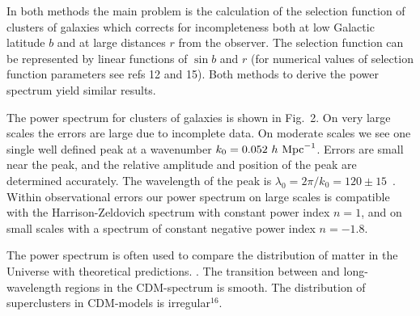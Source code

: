 In both methods the main problem is the calculation of the selection
function of clusters of galaxies which corrects for incompleteness
both at low Galactic latitude $b$ and at large distances $r$ from the
observer. The selection function can be represented by linear
functions of $\sin b$ and $r$ (for numerical values of selection
function parameters see refs 12 and 15). Both methods to derive the power
spectrum yield similar results. 

The power spectrum for clusters of galaxies is shown in Fig.~2.
 On very large
scales the errors are large due to incomplete data. On moderate scales
we see one single well defined peak at a wavenumber $k_0=0.052~h~{\rm
Mpc}^{-1}$.  Errors are small near the peak, and the relative
amplitude and position of the peak are determined 
accurately. The wavelength of the peak is $\lambda_0=2\pi/k_0=120 \pm
15$~\Mpc.  Within observational errors our power spectrum on
large scales is compatible with the Harrison-Zeldovich spectrum with
constant power index $n=1$, and on small scales with a spectrum of
constant negative power index $n=-1.8$.

The power spectrum is often used to compare the distribution of matter in the
Universe with theoretical predictions. .  The transition between  and long-wavelength
regions in the CDM-spectrum is smooth. The distribution of superclusters in
CDM-models is irregular$^{16}$.


